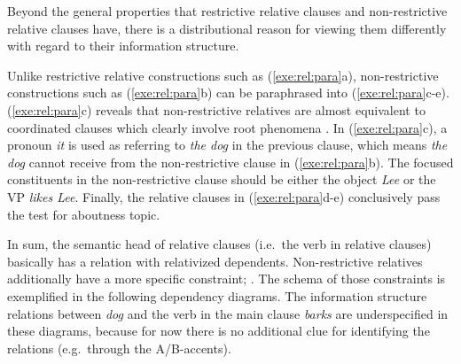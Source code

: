 Beyond the general properties that restrictive relative clauses and
non-restrictive relative clauses have, there is a distributional
reason for viewing them differently with regard to their information
structure.


\noindent Unlike restrictive relative constructions such as
(\ref{exe:rel:para}a), non-restrictive
constructions such as (\ref{exe:rel:para}b) can be paraphrased into
(\ref{exe:rel:para}c-e). (\ref{exe:rel:para}c) reveals that
non-restrictive relatives are almost equivalent to coordinated clauses
which clearly involve root phenomena
\citep[p.\ 177]{heycock:07}. In
(\ref{exe:rel:para}c), a pronoun \textit{it} is used as referring to
\textit{the dog} in the previous clause, which means \textit{the dog}
cannot receive  from the non-restrictive clause in
(\ref{exe:rel:para}b). The focused constituents in the non-restrictive
clause should be either the object \textit{Lee} or the VP
\textit{likes Lee}.  Finally, the relative clauses in
(\ref{exe:rel:para}d-e) conclusively pass the test for aboutness
topic.














In sum, the semantic head of relative clauses (i.e.\ the verb in
relative clauses) basically has a  relation with
relativized dependents. Non-restrictive relatives
additionally have a more specific constraint;
. The schema of those constraints is exemplified
in the following dependency diagrams. The information structure
relations between \textit{dog} and the verb in the main clause
\textit{barks} are underspecified in these diagrams, because for now
there is no additional clue for identifying the relations
(e.g.\ through the A/B-accents).



